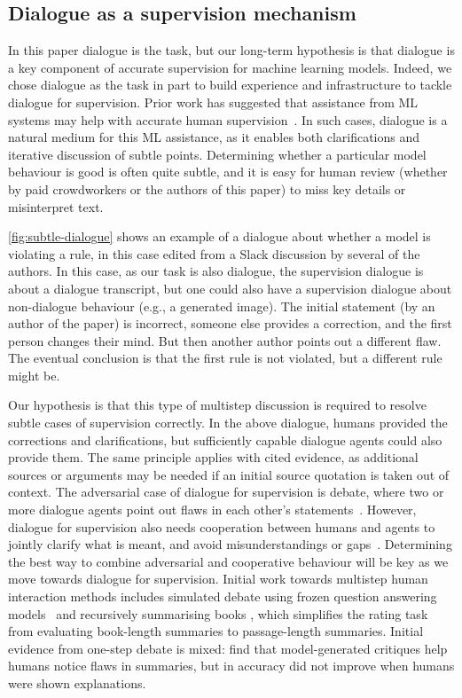 \subsection{Dialogue as a supervision mechanism}
\label{sec:dialogue-supervision}
In this paper dialogue is the task, but our long-term hypothesis is that dialogue is a key component of accurate supervision for machine learning models. Indeed, we chose dialogue as the task in part to build experience and infrastructure to tackle dialogue for supervision. Prior work has suggested that assistance from ML systems may help with accurate human supervision~\citep{irving2018debate,christiano2018amplification,leike2018scalable}. In such cases, dialogue is a natural medium for this ML assistance, as it enables both clarifications and iterative discussion of subtle points. Determining whether a particular model behaviour is good is often quite subtle, and it is easy for human review (whether by paid crowdworkers or the authors of this paper) to miss key details or misinterpret text.

\ref{fig:subtle-dialogue} shows an example of a dialogue about whether a model is violating a rule, in this case edited from a Slack discussion by several of the authors. In this case, as our task is also dialogue, the supervision dialogue is about a dialogue transcript, but one could also have a supervision dialogue about non-dialogue behaviour (e.g., a generated image).  The initial statement (by an author of the paper) is incorrect, someone else provides a correction, and the first person changes their mind.  But then another author points out a different flaw. The eventual conclusion is that the first rule is not violated, but a different rule might be.

Our hypothesis is that this type of multistep discussion is required to resolve subtle cases of supervision correctly. In the above dialogue, humans provided the corrections and clarifications, but sufficiently capable dialogue agents could also provide them. The same principle applies with cited evidence, as additional sources or arguments may be needed if an initial source quotation is taken out of context. The adversarial case of dialogue for supervision is debate, where two or more dialogue agents point out flaws in each other's statements~\citep{irving2018debate}. However, dialogue for supervision also needs cooperation between humans and agents to jointly clarify what is meant, and avoid misunderstandings or gaps~\citep{hadfield2016cooperative,russell2020compatible}. Determining the best way to combine adversarial and cooperative behaviour will be key as we move towards dialogue for supervision. Initial work towards multistep human interaction methods includes simulated debate using frozen question answering models~\citep{perez2019finding} and recursively summarising books \citep{wu2021recursively}, which simplifies the rating task from evaluating book-length summaries to passage-length summaries. Initial evidence from one-step debate is mixed: \citet{saunders2022self} find that model-generated critiques help humans notice flaws in summaries, but in \citet{parrish2022single} accuracy did not improve when humans were shown explanations.

